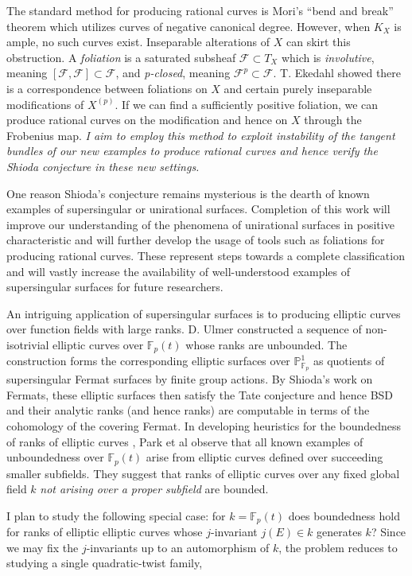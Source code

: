 \documentclass[11pt]{article}
\newcommand{\F}{\mathcal{F}}
\newcommand{\FF}{\mathbb{F}}
\renewcommand{\P}{\mathbb{P}}
\begin{document}
The standard method for producing rational curves is Mori's ``bend and break'' theorem which utilizes curves of negative canonical degree. However, when $K_X$ is ample, no such curves exist. Inseparable alterations of $X$ can skirt this obstruction. A \textit{foliation} is a saturated subsheaf $\F \subset T_X$ which is \textit{involutive}, meaning $[\F, \F] \subset \F$, and \textit{p-closed}, meaning $\F^p \subset \F$. T. Ekedahl showed  there is a correspondence between foliations on $X$ and certain purely inseparable modifications of $X^{(p)}$. If we can find a sufficiently positive foliation, we can produce rational curves on the modification and hence on $X$ through the Frobenius map. \emph{I aim to employ this method to exploit instability of the tangent bundles of our new examples to produce rational curves and hence verify the Shioda conjecture in these new settings.}
\par
One reason Shioda's conjecture remains mysterious is the dearth of known examples of supersingular or unirational surfaces. Completion of this work will improve our understanding of the phenomena of unirational surfaces in positive characteristic and will further develop the usage of tools such as foliations for producing rational curves. These represent steps towards a complete classification and will vastly increase the availability of well-understood examples of supersingular surfaces for future researchers.
\par
An intriguing application of supersingular surfaces is to producing elliptic curves over function fields with large ranks. D. Ulmer constructed  a sequence of non-isotrivial elliptic curves over $\FF_p(t)$ whose ranks are unbounded. The construction forms the corresponding elliptic surfaces over $\P^1_{\FF_p}$ as quotients of supersingular Fermat surfaces by finite group actions. By Shioda's work on Fermats, these elliptic surfaces then satisfy the Tate conjecture and hence BSD and their analytic ranks (and hence ranks) are computable in terms of the cohomology of the covering Fermat. In developing heuristics for the boundedness of ranks of elliptic curves , Park et al observe that all known examples of unboundedness over $\FF_p(t)$ arise from elliptic curves defined over succeeding smaller subfields. They suggest that ranks of elliptic curves over any fixed global field $k$ \textit{not arising over a proper subfield} are bounded. 
\par
I plan to study the following special case: for $k = \FF_p(t)$ does boundedness hold for ranks of elliptic elliptic curves whose $j$-invariant $j(E) \in k$ generates $k$? Since we may fix the $j$-invariants up to an automorphism of $k$, the problem reduces to studying a single quadratic-twist family, 
\end{document}
